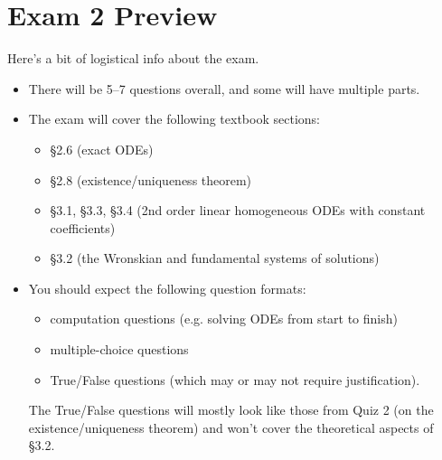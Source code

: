 \documentclass[12pt]{article}
\theoremstyle{definition}
\theoremstyle{underl}
\begin{document}
	\section*{\centering Exam 2 Preview}
	
	\noindent Here's a bit of logistical info about the exam.
	\begin{itemize}[topsep=0.125in,itemsep=0.625mm]
		\item There will be 5--7 questions overall, and some will have multiple parts.
		\item The exam will cover the following textbook sections: 
		\begin{itemize}[topsep=0mm]
			\item \S2.6 (exact ODEs) 
			\item \S2.8 (existence/uniqueness theorem)
			\item \S3.1, \S3.3, \S3.4 (2nd order linear homogeneous ODEs with constant coefficients)
			\item \S3.2 (the Wronskian and fundamental systems of solutions)
		\end{itemize}
		\item You should expect the following question formats:
		\begin{itemize}[topsep=0mm]
			\item computation questions (e.g. solving ODEs from start to finish)
			\item multiple-choice questions
			\item True/False questions (which may or may not require justification).
		\end{itemize}
		The True/False questions will mostly look like those from Quiz 2 (on the existence/uniqueness theorem) and won't cover the theoretical aspects of \S3.2.
	\end{itemize}
	
	\newpage
	
\end{document}

